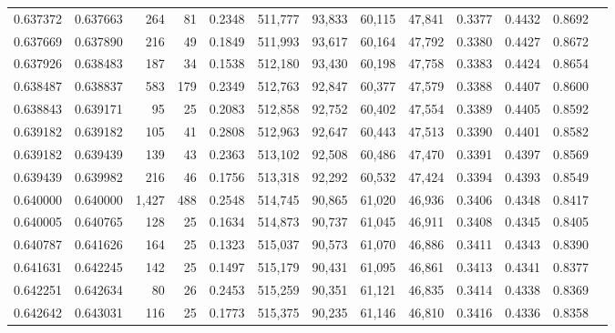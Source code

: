 \begin{tabular}{rrrrrrrrrrrrr}
0.637372 & 0.637663 &   264 &  81 &                                     0.2348 & 511,777 &  93,833 &  60,115 &  47,841 & 0.3377 & 0.4432 & 0.8692 \\
0.637669 & 0.637890 &   216 &  49 &                                     0.1849 & 511,993 &  93,617 &  60,164 &  47,792 & 0.3380 & 0.4427 & 0.8672 \\
0.637926 & 0.638483 &   187 &  34 &                                     0.1538 & 512,180 &  93,430 &  60,198 &  47,758 & 0.3383 & 0.4424 & 0.8654 \\
0.638487 & 0.638837 &   583 & 179 &                                     0.2349 & 512,763 &  92,847 &  60,377 &  47,579 & 0.3388 & 0.4407 & 0.8600 \\
0.638843 & 0.639171 &    95 &  25 &                                     0.2083 & 512,858 &  92,752 &  60,402 &  47,554 & 0.3389 & 0.4405 & 0.8592 \\
0.639182 & 0.639182 &   105 &  41 &                                     0.2808 & 512,963 &  92,647 &  60,443 &  47,513 & 0.3390 & 0.4401 & 0.8582 \\
0.639182 & 0.639439 &   139 &  43 &                                     0.2363 & 513,102 &  92,508 &  60,486 &  47,470 & 0.3391 & 0.4397 & 0.8569 \\
0.639439 & 0.639982 &   216 &  46 &                                     0.1756 & 513,318 &  92,292 &  60,532 &  47,424 & 0.3394 & 0.4393 & 0.8549 \\
0.640000 & 0.640000 & 1,427 & 488 &                                     0.2548 & 514,745 &  90,865 &  61,020 &  46,936 & 0.3406 & 0.4348 & 0.8417 \\
0.640005 & 0.640765 &   128 &  25 &                                     0.1634 & 514,873 &  90,737 &  61,045 &  46,911 & 0.3408 & 0.4345 & 0.8405 \\
0.640787 & 0.641626 &   164 &  25 &                                     0.1323 & 515,037 &  90,573 &  61,070 &  46,886 & 0.3411 & 0.4343 & 0.8390 \\
0.641631 & 0.642245 &   142 &  25 &                                     0.1497 & 515,179 &  90,431 &  61,095 &  46,861 & 0.3413 & 0.4341 & 0.8377 \\
0.642251 & 0.642634 &    80 &  26 &                                     0.2453 & 515,259 &  90,351 &  61,121 &  46,835 & 0.3414 & 0.4338 & 0.8369 \\
0.642642 & 0.643031 &   116 &  25 &                                     0.1773 & 515,375 &  90,235 &  61,146 &  46,810 & 0.3416 & 0.4336 & 0.8358 \\

\end{tabular}
